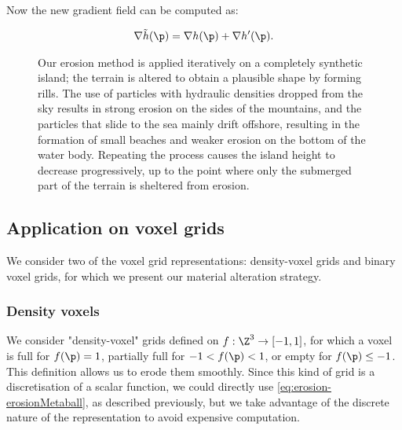Now the new gradient field can be computed as: 

\begin{align*}
    \nabla \Tilde{h}(\p) = \nabla h(\p) + \nabla h'(\p).
\end{align*}

\begin{figure}
    \caption[Erosion simulation on an island]{Our erosion method is applied iteratively on a completely synthetic island; the terrain is altered to obtain a plausible shape by forming rills. The use of particles with hydraulic densities dropped from the sky results in strong erosion on the sides of the mountains, and the particles that slide to the sea mainly drift offshore, resulting in the formation of small beaches and weaker erosion on the bottom of the water body. Repeating the process causes the island height to decrease progressively, up to the point where only the submerged part of the terrain is sheltered from erosion.}
    \label{fig:erosion-continuous-erosion}
\end{figure}

\subsection{Application on voxel grids}
\label{sec:erosion-application_on_voxels}

We consider two of the voxel grid representations: density-voxel grids and binary voxel grids, for which we present our material alteration strategy.

\subsubsection{Density voxels}
\label{sec:erosion-application_on_density_voxels}

We consider "density-voxel" grids defined on $f: \Z^3 \to [-1, 1]$, for which a voxel is full for $f(\p) = 1$, partially full for $-1 < f(\p) < 1$, or empty for $f(\p) \leq -1$.  
This definition allows us to erode them smoothly.  
Since this kind of grid is a discretisation of a scalar function, we could directly use \eqref{eq:erosion-erosionMetaball}, as described previously, but we take advantage of the discrete nature of the representation to avoid expensive computation. 

